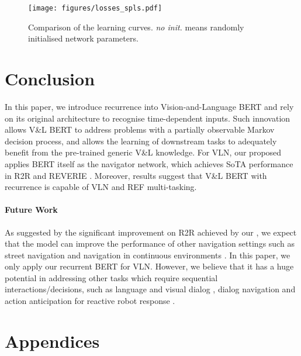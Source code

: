 \documentclass[final]{cvpr}
\begin{document}
\begin{figure}[tp!]
  \centering
  \texttt{[image: figures/losses\_spls.pdf]}
  \caption{Comparison of the learning curves. \textit{no init.} means randomly initialised network parameters.}
  \label{fig:train_curve}
  \vspace{-10pt}
\end{figure} \section{Conclusion} 
\label{sec:conclusion}
In this paper, we introduce recurrence into Vision-and-Language BERT and rely on its original architecture to recognise time-dependent inputs. Such innovation allows V\&L BERT to address problems with a partially observable Markov decision process, and allows the learning of downstream tasks to adequately benefit from the pre-trained generic V\&L knowledge. For VLN, our proposed \vlnbert~ applies BERT itself as the navigator network, which achieves SoTA performance in R2R \cite{anderson2018vision} and REVERIE \cite{qi2020reverie}. Moreover, results suggest that V\&L BERT with recurrence is capable of VLN and REF multi-tasking.

\vspace{-15pt}
\paragraph{Future Work} As suggested by the significant improvement on R2R \cite{anderson2018vision} achieved by our \vlnbert, we expect that the model can improve the performance of other navigation settings such as street navigation \cite{chen2019touchdown} and navigation in continuous environments \cite{krantz2020navgraph}. In this paper, we only apply our recurrent BERT for VLN. However, we believe that it has a huge potential in addressing other tasks which require sequential interactions/decisions, such as language and visual dialog \cite{byrne2019taskmaster,das2017visual, kottur2019clevr,lee2019multi,Rastogi2020TowardsSM}, dialog navigation \cite{de2018talk,nguyen2019help,nguyen2019vision} and action anticipation for reactive robot response \cite{aliakbarian2018viena,furnari2019would,koppula2015anticipating}.
 
{\small


}

\clearpage

\appendix
\section*{Appendices}
\end{document}
